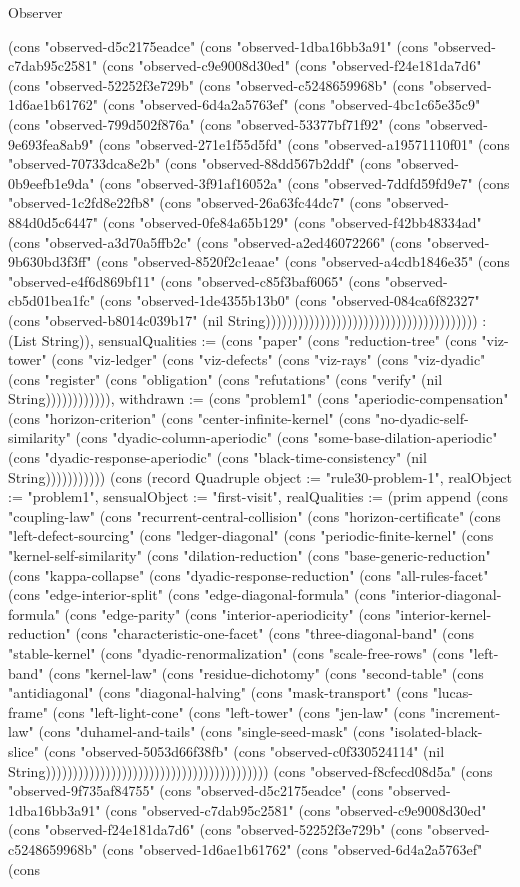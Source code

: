 \begin{lexlean}{Observer}
\begin{semanticmodule}
{(cons "observed-d5c2175eadce" (cons "observed-1dba16bb3a91" (cons "observed-c7dab95c2581" (cons "observed-c9e9008d30ed" (cons "observed-f24e181da7d6" (cons "observed-52252f3e729b" (cons "observed-c5248659968b" (cons "observed-1d6ae1b61762" (cons "observed-6d4a2a5763ef" (cons "observed-4bc1c65e35c9" (cons "observed-799d502f876a" (cons "observed-53377bf71f92" (cons "observed-9e693fea8ab9" (cons "observed-271e1f55d5fd" (cons "observed-a19571110f01" (cons "observed-70733dca8e2b" (cons "observed-88dd567b2ddf" (cons "observed-0b9eefb1e9da" (cons "observed-3f91af16052a" (cons "observed-7ddfd59fd9e7" (cons "observed-1c2fd8e22fb8" (cons "observed-26a63fc44dc7" (cons "observed-884d0d5c6447" (cons "observed-0fe84a65b129" (cons "observed-f42bb48334ad" (cons "observed-a3d70a5ffb2c" (cons "observed-a2ed46072266" (cons "observed-9b630bd3f3ff" (cons "observed-8520f2c1eaae" (cons "observed-a4cdb1846e35" (cons "observed-e4f6d869bf11" (cons "observed-c85f3baf6065" (cons "observed-cb5d01bea1fc" (cons "observed-1de4355b13b0" (cons "observed-084ca6f82327" (cons "observed-b8014c039b17" (nil String))))))))))))))))))))))))))))))))))))))) : (List String)), sensualQualities := (cons "paper" (cons "reduction-tree" (cons "viz-tower" (cons "viz-ledger" (cons "viz-defects" (cons "viz-rays" (cons "viz-dyadic" (cons "register" (cons "obligation" (cons "refutations" (cons "verify" (nil String)))))))))))), withdrawn := (cons "problem1" (cons "aperiodic-compensation" (cons "horizon-criterion" (cons "center-infinite-kernel" (cons "no-dyadic-self-similarity" (cons "dyadic-column-aperiodic" (cons "some-base-dilation-aperiodic" (cons "dyadic-response-aperiodic" (cons "black-time-consistency" (nil String))))))))))}) (cons (record Quadruple {object := "rule30-problem-1", realObject := "problem1", sensualObject := "first-visit", realQualities := (prim append (cons "coupling-law" (cons "recurrent-central-collision" (cons "horizon-certificate" (cons "left-defect-sourcing" (cons "ledger-diagonal" (cons "periodic-finite-kernel" (cons "kernel-self-similarity" (cons "dilation-reduction" (cons "base-generic-reduction" (cons "kappa-collapse" (cons "dyadic-response-reduction" (cons "all-rules-facet" (cons "edge-interior-split" (cons "edge-diagonal-formula" (cons "interior-diagonal-formula" (cons "edge-parity" (cons "interior-aperiodicity" (cons "interior-kernel-reduction" (cons "characteristic-one-facet" (cons "three-diagonal-band" (cons "stable-kernel" (cons "dyadic-renormalization" (cons "scale-free-rows" (cons "left-band" (cons "kernel-law" (cons "residue-dichotomy" (cons "second-table" (cons "antidiagonal" (cons "diagonal-halving" (cons "mask-transport" (cons "lucas-frame" (cons "left-light-cone" (cons "left-tower" (cons "jen-law" (cons "increment-law" (cons "duhamel-and-tails" (cons "single-seed-mask" (cons "isolated-black-slice" (cons "observed-5053d66f38fb" (cons "observed-c0f330524114" (nil String))))))))))))))))))))))))))))))))))))))))) (cons "observed-f8cfecd08d5a" (cons "observed-9f735af84755" (cons "observed-d5c2175eadce" (cons "observed-1dba16bb3a91" (cons "observed-c7dab95c2581" (cons "observed-c9e9008d30ed" (cons "observed-f24e181da7d6" (cons "observed-52252f3e729b" (cons "observed-c5248659968b" (cons "observed-1d6ae1b61762" (cons "observed-6d4a2a5763ef" (cons }
\end{semanticmodule}
\end{lexlean}
